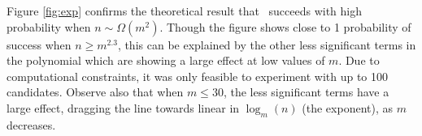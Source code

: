 Figure \ref{fig:exp} confirms the theoretical result that \gwin~succeeds with
high probability when $n \sim \Omega(m^2)$.
Though the figure shows close to 1 probability of success when $n \geq m^{2.3}$,
this can be explained by the other less significant terms in the polynomial which
are showing a large effect at low values of $m$.
Due to computational constraints, it was only feasible to experiment with up to
100 candidates.
Observe also that when $m \leq 30$, the less significant terms have a large effect,
dragging the line towards linear in $\log_m(n)$ (the exponent), as $m$ decreases.




